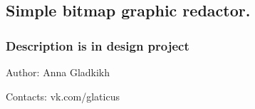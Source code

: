 \subsection*{Simple bitmap graphic redactor.}

\subsubsection*{Description is in design project}

Author\+: Anna Gladkikh

Contacts\+: vk.\+com/glaticus 